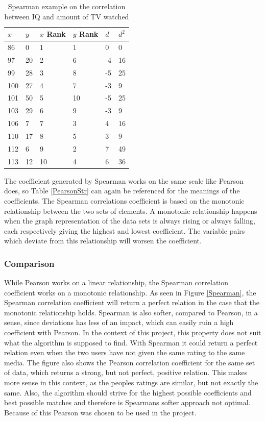 \begin{table}[htb]
\centering
\begin{tabular}{|l|l|l|l|l|l|} \hline
	\textbf{$x$} & \textbf{$y$} & \textbf{$x$ Rank} & \textbf{$y$ Rank} & \textbf{$d$} & \textbf{$d^2$} \\ \hline
	86 & 0 & 1 & 1 & 0 & 0 \\ \hline
	97 & 20 & 2 & 6 & -4 & 16 \\ \hline
	99 & 28 & 3 & 8 & -5 & 25 \\ \hline
	100 & 27 & 4 & 7 & -3 & 9 \\ \hline
	101 & 50 & 5 & 10 & -5 & 25 \\ \hline
	103 & 29 & 6 & 9 & -3 & 9 \\ \hline
	106 & 7 & 7 & 3 & 4 & 16 \\ \hline
	110 & 17 & 8 & 5 & 3 & 9 \\ \hline
	112 & 6 & 9 & 2 & 7 & 49 \\ \hline
	113 & 12 & 10 & 4 & 6 & 36 \\ \hline
\end{tabular}
\caption{Spearman example on the correlation between IQ and amount of TV watched \cite{Spearman2}}
\label{SpearmanEx}
\end{table}

The coefficient generated by Spearman works on the same scale like Pearson does, so Table \ref{PearsonStr} can again be referenced for the meanings of the coefficients. The Spearman correlations coefficient is based on the monotonic relationship between the two sets of elements\cite{Spearman2}. A monotonic relationship happens when the graph representation of the data sets is always rising or always falling, each respectively giving the highest and lowest coefficient. The variable pairs which deviate from this relationship will worsen the coefficient.

\subsubsection{Comparison}

While Pearson works on a linear relationship, the Spearman correlation coefficient works on a monotonic relationship. As seen in Figure \ref{Spearman}, the Spearman correlation coefficient will return a perfect relation in the case that the monotonic relationship holds. Spearman is also softer, compared to Pearson, in a sense, since deviations has less of an impact, which can easily ruin a high coefficient with Pearson. In the context of this project, this property does not suit what the algorithm is supposed to find. With Spearman it could return a perfect relation even when the two users have not given the same rating to the same media. The figure also shows the Pearson correlation coefficient for the same set of data, which returns a strong, but not perfect, positive relation. This makes more sense in this context, as the peoples ratings are similar, but not exactly the same. Also, the algorithm should strive for the highest possible coefficients and best possible matches and therefore is Spearmans softer approach not optimal. Because of this Pearson was chosen to be used in the project.

